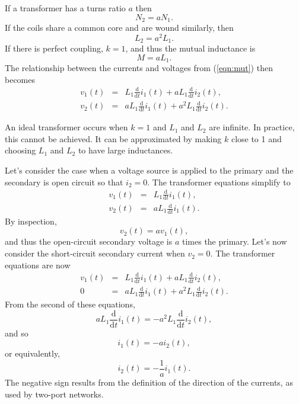 \documentclass[a4paper, 12pt]{article}
\newcommand{\ud}{\mathrm{d}}
\newcommand{\udby}[1]{\frac{\ud}{\ud #1}}
\newcommand{\refeqn}[1]{\mbox{(\ref{eqn:#1})}}
\begin{document}
If a transformer has a turns ratio $a$ then
%
\begin{equation}
N_2 = a N_1.
\end{equation}
%
If the coils share a common core and are wound similarly, then
%
\begin{equation}
  L_2 = a^2 L_1.
\end{equation}
%
If there is perfect coupling, $k=1$, and thus the mutual inductance is
%
\begin{equation}
  M = a L_1.
\end{equation}
%
The relationship between the currents and voltages from \refeqn{mut}
then becomes
%
\begin{eqnarray}
 v_1(t) & = & L_1 \udby{t} i_1(t) + a L_1 \udby{t} i_2(t),\\
 v_2(t) & = & a L_1 \udby{t} i_1(t) + a^2 L_1 \udby{t} i_2(t).
\label{eqn:mut_transformer}
\end{eqnarray}


An ideal transformer occurs when $k=1$ and $L_1$ and $L_2$ are
infinite.  In practice, this cannot be achieved.  It can be
approximated by making $k$ close to 1 and choosing $L_1$ and $L_2$
to have large inductances.

Let's consider the case when a voltage source is applied to the
primary and the secondary is open circuit so that $i_2=0$.  The
transformer equations simplify to
%
\begin{eqnarray}
 v_1(t) & = & L_1 \udby{t} i_1(t),\\
 v_2(t) & = & a L_1 \udby{t} i_1(t).
\label{eqn:mut_transformer_oc}
\end{eqnarray}
%
By inspection, 
%
\begin{equation}
v_2(t) = a v_1(t),  
\end{equation}
%
and thus the open-circuit secondary voltage is $a$ times the primary.
Let's now consider the short-circuit secondary current when $v_2=0$.
The transformer equations are now
%
\begin{eqnarray}
 v_1(t) & = & L_1 \udby{t} i_1(t) + a L_1 \udby{t} i_2(t),\\
      0 & = & a L_1 \udby{t} i_1(t) + a^2 L_1 \udby{t} i_2(t).
\label{eqn:mut_transformer_sc}
\end{eqnarray}
%
From the second of these equations,
%
\begin{equation}
  a L_1 \udby{t} i_1(t) = -a^2 L_1 \udby{t} i_2(t),
\end{equation}
%
and so
%
\begin{equation}
  i_1(t) = -a i_2(t),
\end{equation}
%
or equivalently,
%
\begin{equation}
  i_2(t) = -\frac{1}{a} i_1(t).
\end{equation}
%
The negative sign results from the definition of the direction of the
currents, as used by two-port networks.
\end{document}
